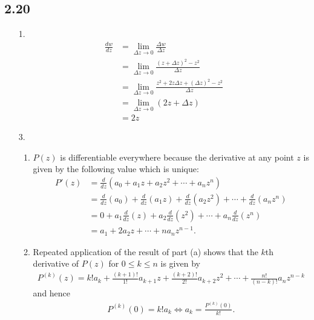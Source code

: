 \documentclass[a4paper,12pt]{article}
\begin{document}
\subsection*{2.20}
\begin{enumerate}
    \item[1.]
        \begin{align*}
            \frac{dw}{dz} &= \lim_{\Delta z \to 0} \frac{\Delta w}{\Delta z} \\
            &= \lim_{\Delta z \to 0} \frac{(z + \Delta z)^2 - z^2}{\Delta z} \\
            &= \lim_{\Delta z \to 0} \frac{z^2 + 2z \Delta z + (\Delta z)^2 - z^2}{\Delta z} \\
            &= \lim_{\Delta z \to 0} (2z + \Delta z) \\
            &= 2z
        \end{align*}

    \item[3.]
        \begin{enumerate}
            \item
                $P(z)$ is differentiable everywhere because the derivative at any point $z$ is given by the following value which is unique:
                \begin{align*}
                    P'(z) &= \frac{d}{dz} \left( a_0 + a_1 z + a_2 z^2 + \cdots + a_n z^n \right) \\
                    &= \frac{d}{dz} \left( a_0 \right) + \frac{d}{dz} \left( a_1 z \right) + \frac{d}{dz} \left( a_2 z^2 \right) + \cdots + \frac{d}{dz} \left( a_n z^n \right) \\
                    &= 0 + a_1 \frac{d}{dz} \left( z \right) + a_2 \frac{d}{dz} \left( z^2 \right) + \cdots + a_n \frac{d}{dz} \left( z^n \right) \\
                    &= a_1 + 2 a_2 z + \cdots + n a_n z^{n - 1}.
                \end{align*}

            \item
                Repeated application of the result of part (a) shows that the $k$th derivative of $P(z)$ for $0 \leq k \leq n$ is given by
                \begin{align*}
                    P^{(k)}(z) = k! a_k + \frac{(k + 1)!}{1!} a_{k + 1} z + \frac{(k + 2)!}{2!} a_{k + 2} z^2 + \cdots + \frac{n!}{(n - k)!} a_n z^{n - k}
                \end{align*}
                and hence
                \begin{align*}
                    P^{(k)}(0) = k! a_k \Leftrightarrow a_k = \frac{P^{(k)}(0)}{k!}.
                \end{align*}
        \end{enumerate}


\end{enumerate}
\end{document}

